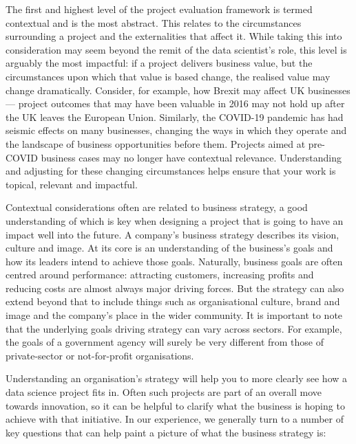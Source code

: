 \documentclass[]{book}
\begin{document}
The first and highest level of the project evaluation framework is
termed contextual and is the most abstract. This relates to the
circumstances surrounding a project and the externalities that affect
it. While taking this into consideration may seem beyond the remit of
the data scientist's role, this level is arguably the most impactful: if
a project delivers business value, but the circumstances upon which that
value is based change, the realised value may change dramatically.
Consider, for example, how Brexit may affect UK businesses --- project
outcomes that may have been valuable in 2016 may not hold up after the
UK leaves the European Union. Similarly, the COVID-19 pandemic has had
seismic effects on many businesses, changing the ways in which they
operate and the landscape of business opportunities before them.
Projects aimed at pre-COVID business cases may no longer have contextual
relevance. Understanding and adjusting for these changing circumstances
helps ensure that your work is topical, relevant and impactful.

Contextual considerations often are related to business strategy, a good
understanding of which is key when designing a project that is going to
have an impact well into the future. A company's business strategy
describes its vision, culture and image. At its core is an understanding
of the business's goals and how its leaders intend to achieve those
goals. Naturally, business goals are often centred around performance:
attracting customers, increasing profits and reducing costs are almost
always major driving forces. But the strategy can also extend beyond
that to include things such as organisational culture, brand and image
and the company's place in the wider community. It is important to note
that the underlying goals driving strategy can vary across sectors. For
example, the goals of a government agency will surely be very different
from those of private-sector or not-for-profit organisations.

Understanding an organisation's strategy will help you to more clearly
see how a data science project fits in. Often such projects are part of
an overall move towards innovation, so it can be helpful to clarify what
the business is hoping to achieve with that initiative. In our
experience, we generally turn to a number of key questions that can help
paint a picture of what the business strategy is:
\end{document}
